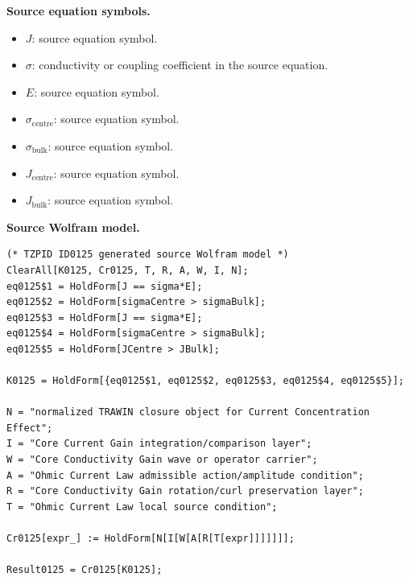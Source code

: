 \begin{minipage}[t]{0.49\linewidth}
\begingroup
\small
\raggedright
\textbf{Source equation symbols.}\par
\begin{itemize}[leftmargin=1.35em,itemsep=1pt,topsep=1pt,parsep=0pt]
    \item $J$: source equation symbol.
    \item $\sigma$: conductivity or coupling coefficient in the source equation.
    \item $E$: source equation symbol.
    \item $\sigma_{\mathrm{centre}}$: source equation symbol.
    \item $\sigma_{\mathrm{bulk}}$: source equation symbol.
    \item $J_{\mathrm{centre}}$: source equation symbol.
    \item $J_{\mathrm{bulk}}$: source equation symbol.
\end{itemize}
\endgroup
\end{minipage}\hfill
\begin{minipage}[t]{0.47\linewidth}
\begingroup
\scriptsize
\raggedright
\textbf{Source Wolfram model.}\par
\begin{Verbatim}[fontsize=\tiny,breaklines=true,breakanywhere=true]
(* TZPID ID0125 generated source Wolfram model *)
ClearAll[K0125, Cr0125, T, R, A, W, I, N];
eq0125$1 = HoldForm[J == sigma*E];
eq0125$2 = HoldForm[sigmaCentre > sigmaBulk];
eq0125$3 = HoldForm[J == sigma*E];
eq0125$4 = HoldForm[sigmaCentre > sigmaBulk];
eq0125$5 = HoldForm[JCentre > JBulk];

K0125 = HoldForm[{eq0125$1, eq0125$2, eq0125$3, eq0125$4, eq0125$5}];

N = "normalized TRAWIN closure object for Current Concentration Effect";
I = "Core Current Gain integration/comparison layer";
W = "Core Conductivity Gain wave or operator carrier";
A = "Ohmic Current Law admissible action/amplitude condition";
R = "Core Conductivity Gain rotation/curl preservation layer";
T = "Ohmic Current Law local source condition";

Cr0125[expr_] := HoldForm[N[I[W[A[R[T[expr]]]]]]];

Result0125 = Cr0125[K0125];
\end{Verbatim}
\endgroup
\end{minipage}

